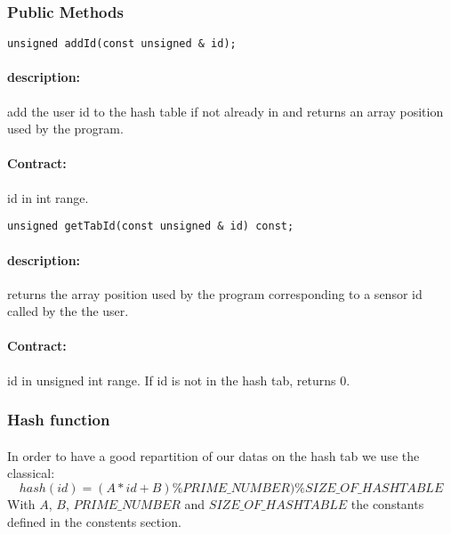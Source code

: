 \documentclass[a4paper, 12pts]{article}
\begin{document}
    
\subsubsection{Public Methods}

\begin{lstlisting}
unsigned addId(const unsigned & id);
\end{lstlisting}
\paragraph{description:}
	add the user id to the hash table if not already in and returns an array position used by the program.
\paragraph{Contract:}
	id in int range.
\begin{lstlisting}
unsigned getTabId(const unsigned & id) const;
\end{lstlisting}
\paragraph{description:}
	returns the array position used by the program corresponding to a sensor id called by the the user.
\paragraph{Contract:}
	id in unsigned int range. If id is not in the hash tab, returns 0.
	
\subsubsection{Hash function}

\paragraph{}
	In order to have a good repartition of our datas on the hash tab we use the classical:
\begin{equation}
	hash(id)=(A*id+B)\%PRIME\_NUMBER)\%SIZE\_OF\_HASHTABLE
\end{equation}	
	With $A$, $B$, $PRIME\_NUMBER$ and $SIZE\_OF\_HASHTABLE$ the constants defined in the constents section.
	
\end{document}
